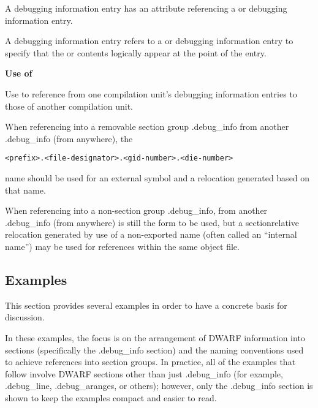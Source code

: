 A  debugging information entry has an
 attribute referencing a  or
 debugging information entry.

A  debugging information entry refers
to a 
 or 
 debugging
information entry to specify that the 
 or
 contents logically appear at the point
of the 
 entry.


\textbf{Use of }

Use 
 to reference from one compilation
unit's debugging information entries to those of another
compilation unit.

When referencing into a removable section group .debug\_info
from another .debug\_info (from anywhere), the
\begin{alltt}
<prefix>.<file-designator>.<gid-number>.<die-number>
\end{alltt}
name should be used for an external symbol and a relocation
generated based on that name.

When referencing into a non-section group .debug\_info,
from another .debug\_info (from anywhere) 
 is
still the form to be used, but a section\dash relative relocation
generated by use of a non-exported name (often called an
``internal name'') may be used for references within the
same object file.

\subsection{Examples}
\label{app:examples}

This section provides several examples in order to have a
concrete basis for discussion.

In these examples, the focus is on the arrangement of DWARF
information into sections (specifically the .debug\_info
section) and the naming conventions used to achieve references
into section groups. In practice, all of the examples that
follow involve DWARF sections other than just .debug\_info
(for example, .debug\_line, .debug\_aranges, or others);
however, only the .debug\_info section is shown to keep the
examples compact and easier to read.

